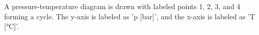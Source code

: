 A pressure-temperature diagram is drawn with labeled points 1, 2, 3, and 4 forming a cycle. The y-axis is labeled as 'p [bar]', and the x-axis is labeled as 'T [°C]'.